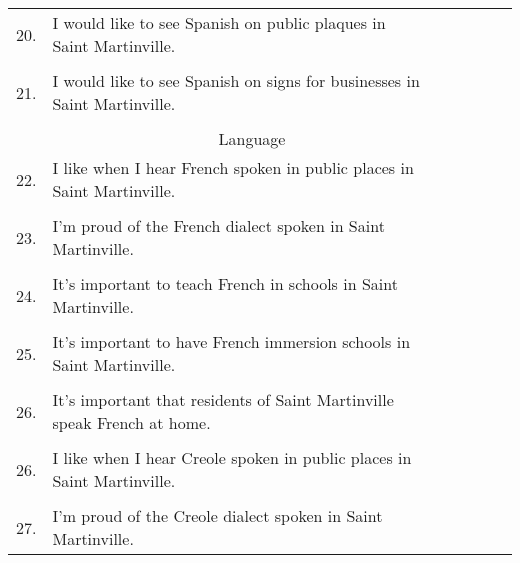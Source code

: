 \begin{longtable}[c]{| r p{} | c | c | c | c | c |}
          &                                                                           & & & & & \\
      \hline
      20. & I would like to see Spanish on public plaques in Saint Martinville.       & & & & & \\
          &                                                                           & & & & & \\
      \hline
      21. & I would like to see Spanish on signs for businesses in Saint Martinville. & & & & & \\
          &                                                                           & & & & & \\
      \hline
      \multicolumn{6}{c}{Language} \\
      \hline
      22. & I like when I hear French spoken in public places in Saint Martinville.   & & & & & \\
          &                                                                           & & & & & \\
      \hline
      23. & I'm proud of the French dialect spoken in Saint Martinville.              & & & & & \\
          &                                                                           & & & & & \\
      \hline
      24. & It's important to teach French in schools in Saint Martinville.           & & & & & \\
          &                                                                           & & & & & \\
      \hline
      25. & It's important to have French immersion schools in Saint Martinville.     & & & & & \\
          &                                                                           & & & & & \\
      \hline
      26. & It's important that residents of Saint Martinville speak French at home.  & & & & & \\
          &                                                                           & & & & & \\
      \hline
      26. & I like when I hear Creole spoken in public places in Saint Martinville.   & & & & & \\
          &                                                                           & & & & & \\
      \hline
      27. & I'm proud of the Creole dialect spoken in Saint Martinville.              & & & & & \\

\end{longtable}
